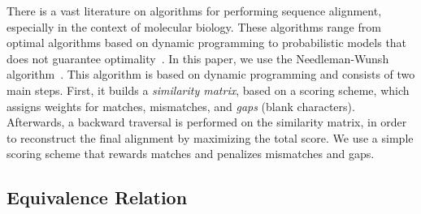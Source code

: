 
There is a vast literature on algorithms for performing sequence alignment,
especially in the context of molecular biology.
These algorithms range from optimal algorithms based on dynamic programming to
probabilistic models that does not guarantee
optimality~\cite{needleman70,smith81,carrillo88,hickey11}. 
In this paper, we use the Needleman-Wunsh algorithm~\cite{needleman70}.
This algorithm is based on dynamic programming and consists of two main steps.
First, it builds a \textit{similarity matrix}, based on a scoring scheme, which
assigns weights for matches, mismatches, and \textit{gaps} (blank characters).
Afterwards, a backward traversal is performed on the similarity matrix, in order
to reconstruct the final alignment by maximizing the total score.
We use a simple scoring scheme that rewards matches and penalizes mismatches and
gaps.


\subsection{Equivalence Relation}

